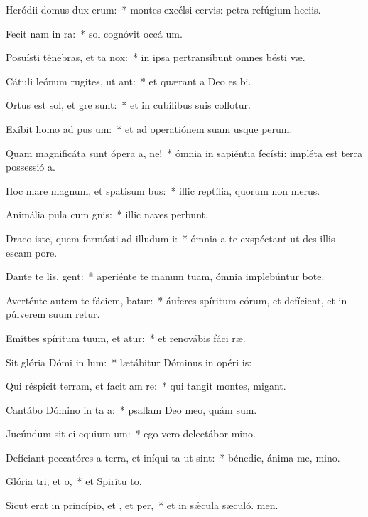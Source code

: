 \item Heródii domus dux  erum:~* montes excélsi cervis: petra refúgium heciis.
\item Fecit nam in ra:~* sol cognóvit occá um.
\item Posuísti ténebras, et ta  nox:~* in ipsa pertransíbunt omnes bésti væ.
\item Cátuli leónum rugites, ut ant:~* et quærant a Deo es bi.
\item Ortus est sol, et gre sunt:~* et in cubílibus suis collotur.
\item Exíbit homo ad pus um:~* et ad operatiónem suam usque  perum.
\item Quam magnificáta sunt ópera a, ne!~* ómnia in sapiéntia fecísti: impléta est terra possessió a.
\item Hoc mare magnum, et spatisum bus:~* illic reptília, quorum non  merus.
\item Animália pula cum gnis:~* illic naves perbunt.
\item Draco iste, quem formásti ad illudum i:~* ómnia a te exspéctant ut des illis escam  pore.
\item Dante te lis, gent:~* aperiénte te manum tuam, ómnia implebúntur bote.
\item Averténte autem te fáciem, batur:~* áuferes spíritum eórum, et defícient, et in púlverem suum retur.
\item Emíttes spíritum tuum, et atur:~* et renovábis fáci ræ.
\item Sit glória Dómi in lum:~* lætábitur Dóminus in opéri is:
\item Qui réspicit terram, et facit am re:~* qui tangit montes,  migant.
\item Cantábo Dómino in ta a:~* psallam Deo meo, quám sum.
\item Jucúndum sit ei equium um:~* ego vero delectábor  mino.
\item Defíciant peccatóres a terra, et iníqui ta ut  sint:~* bénedic, ánima me, mino.
\item Glória tri, et o,~* et Spirítu to.
\item Sicut erat in princípio, et , et per,~* et in sǽcula sæculó. men.
